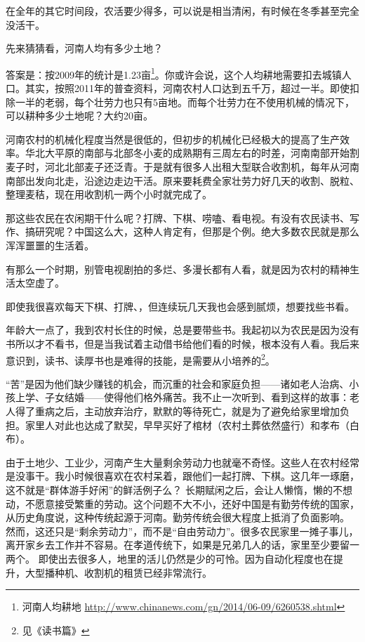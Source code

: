 在全年的其它时间段，农活要少得多，可以说是相当清闲，有时候在冬季甚至完全没活干。



先来猜猜看，河南人均有多少土地？

答案是：按2009年的统计是1.23亩\footnote{河南人均耕地 \url{http://www.chinanews.com/gn/2014/06-09/6260538.shtml}}。你或许会说，这个人均耕地需要扣去城镇人口。其实，按照2011年的普查资料，河南农村人口达到五千万，超过一半。即使扣除一半的老弱，每个壮劳力也只有5亩地。而每个壮劳力在不使用机械的情况下，可以耕种多少土地呢？大约20亩。

河南农村的机械化程度当然是很低的，但初步的机械化已经极大的提高了生产效率。华北大平原的南部与北部冬小麦的成熟期有三周左右的时差，河南南部开始割麦子时，河北北部麦子还泛青。于是就有很多人出租大型联合收割机，每年从河南南部出发向北走，沿途边走边干活。原来要耗费全家壮劳力好几天的收割、脱粒、整理麦秸，现在用收割机一两个小时就完成了。


那这些农民在农闲期干什么呢？打牌、下棋、唠嗑、看电视。有没有农民读书、写作、搞研究呢？中国这么大，这种人肯定有，但那是个例。绝大多数农民就是那么浑浑噩噩的生活着。

有那么一个时期，别管电视剧拍的多烂、多漫长都有人看，就是因为农村的精神生活太空虚了。

即使我很喜欢每天下棋、打牌、，但连续玩几天我也会感到腻烦，想要找些书看。

年龄大一点了，我到农村长住的时候，总是要带些书。我起初以为农民是因为没有书所以才不看书，但是当我试着主动借书给他们看的时候，根本没有人看。我后来意识到，读书、读厚书也是难得的技能，是需要从小培养的\footnote{见《读书篇》}。


“苦”是因为他们缺少赚钱的机会，而沉重的社会和家庭负担——诸如老人治病、小孩上学、子女结婚——使得他们格外痛苦。我不止一次听到、看到这样的故事：老人得了重病之后，主动放弃治疗，默默的等待死亡，就是为了避免给家里增加负担。家里人对此也达成了默契，早早买好了棺材（农村土葬依然盛行）和孝布（白布）。

由于土地少、工业少，河南产生大量剩余劳动力也就毫不奇怪。这些人在农村经常是没事干。我小时候很喜欢在农村呆着，跟他们一起打牌、下棋。这几年一琢磨，这不就是“群体游手好闲”的鲜活例子么？
长期赋闲之后，会让人懒惰，懒的不想动，不愿意接受繁重的劳动。这个问题不大不小，还好中国是有勤劳传统的国家，从历史角度说，这种传统起源于河南。勤劳传统会很大程度上抵消了负面影响。
然而，这还只是“剩余劳动力”，而不是“自由劳动力”。很多农民家里一摊子事儿，离开家乡去工作并不容易。在孝道传统下，如果是兄弟几人的话，家里至少要留一两个。
即使出去很多人，地里的活儿仍然是少的可怜。因为自动化程度也在提升，大型播种机、收割机的租赁已经非常流行。

